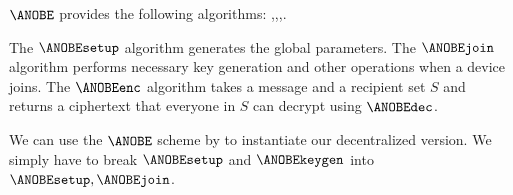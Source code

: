 
\(\ANOBE\) provides the following algorithms:
\ANOBEsetup,\allowbreak \ANOBEjoin,\allowbreak \ANOBEenc,\allowbreak \ANOBEdec.

The \(\ANOBEsetup\) algorithm generates the global parameters.
The \(\ANOBEjoin\) algorithm performs necessary key generation and other 
operations when a device joins.
The \(\ANOBEenc\) algorithm takes a message and a recipient set \(S\) and returns 
a ciphertext that everyone in \(S\) can decrypt using \(\ANOBEdec\).


We can use the \(\ANOBE\) scheme by \textcite{ANOBE} to instantiate our 
decentralized version.
We simply have to break \(\ANOBEsetup\) and \(\ANOBEkeygen\) into 
\(\ANOBEsetup,\allowbreak \ANOBEjoin\).

\endinput

\(\ANOBEsetup\) generates a master public key \(MPK = (\S*, \{\PubKey{i}\}_{i\in
    U})\) and the master secret key \(MSK = \{\PriKey{i}\}_{i\in U}\), where 
\((\PubKey{i}, \PriKey{i})\rgets \E*[Keygen][1^\lambda]\).
\(\ANOBE[Keygen][MPK, MSK, i]\) simply returns \(\PriKey{i}\) from \(MSK\).

For encryption, we must first generate a one-time signature key-pair 
\((\SignKey{}, \VerifKey{})\), then we choose a random permutation \(\pi\colon 
  R\to R\).
Next we must encrypt the message \(m\) and the verification key \((m, 
  \VerifKey{})\) for every user \(i\in R\) in the recipient set \(R\subseteq 
  U\) under their respective public key, \(c_{i} = \E*[Enc][\PubKey{i}, 
  m\concat \VerifKey{}]\).
We let the \ac{ANOBE} ciphertext be the tuple \((\VerifKey{}, C, \sigma)\), 
where
\(C = ( c_{\pi(1)}, \ldots, c_{\pi({|S|})})\) and
\(\sigma = \S*[Sign][\SignKey{}, C ]\).
Note that the signature does not authenticate the sender, it ties the 
ciphertext together and is needed for correctness.

